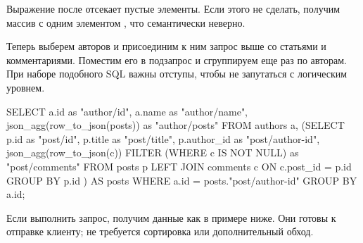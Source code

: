 Выражение  после  отсекает пустые элементы. Если этого не сделать, получим массив с одним элементом , что семантически неверно.

Теперь выберем авторов и присоединим к ним запрос выше со статьями и комментариями. Поместим его в подзапрос и сгруппируем еще раз по авторам. При наборе подобного SQL важны отступы, чтобы не запутаться с логическим уровнем.

\begin{english}
  \begin{sql}
SELECT
  a.id                         as "author/id",
  a.name                       as "author/name",
  json_agg(row_to_json(posts)) as "author/posts"
FROM
  authors a,
  (SELECT
    p.id        as "post/id",
    p.title     as "post/title",
    p.author_id as "post/author-id",
    json_agg(row_to_json(c)) FILTER (WHERE c IS NOT NULL) as "post/comments"
  FROM posts p
  LEFT JOIN comments c ON c.post_id = p.id
  GROUP BY p.id
) AS posts
WHERE a.id = posts."post/author-id"
GROUP BY a.id;
  \end{sql}
\end{english}

Если выполнить запрос, получим данные как в примере ниже. Они готовы к отправке клиенту; не требуется сортировка или дополнительный обход.

\begin{english}
  \begin{clojure}
  \end{clojure}
\end{english}

